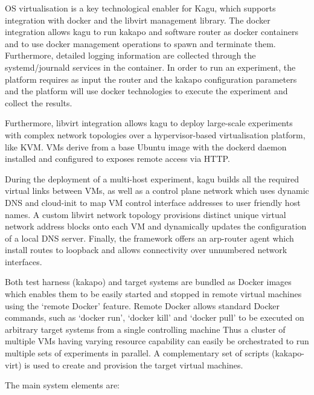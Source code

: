 OS virtualisation is a key technological enabler for Kagu, which supports
integration with docker and the libvirt management library.  The docker
integration allows kagu to run kakapo and software router as docker containers
and to use docker management operations to spawn and terminate them.
Furthermore, detailed logging information are collected through the
systemd/journald services in the container. In order to run an experiment, the
platform requires as input the router and the kakapo configuration parameters
and the platform will use docker technologies to execute the experiment and
collect the results.

Furthermore, libvirt integration allows kagu to deploy large-scale experiments
with complex network topologies over a hypervisor-based virtualisation
platform, like KVM. VMs derive from a base Ubuntu image with the dockerd
daemon installed and configured to exposes remote access via HTTP.

During the deployment of a multi-host experiment, kagu builds all the required
virtual links between VMs, as well as a control plane network which uses
dynamic DNS and cloud-init to map VM control interface addresses to user
friendly host names. A custom libvirt network topology provisions distinct
unique virtual network address blocks onto each VM and dynamically updates the
configuration of a local DNS server.  Finally, the framework offers an
arp-router agent which install routes to loopback and allows connectivity over
unnumbered network interfaces.

Both test harness (kakapo) and target systems are bundled as Docker images
which enables them to be easily started and stopped in remote virtual machines
using the ‘remote Docker’ feature.  Remote Docker allows standard Docker
commands, such as ‘docker run’, ‘docker kill’ and ‘docker pull’ to be executed
on arbitrary target systems from a single controlling machine  Thus a cluster
of multiple VMs having varying resource capability can easily be orchestrated
to run multiple sets of experiments in parallel.  A complementary set of
scripts (kakapo-virt) is used to create and provision the target virtual
machines.

The main system elements are:

